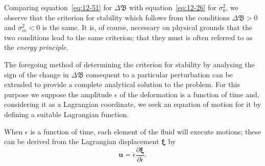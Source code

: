 Comparing equation~\eqref{eq:12-51} for $\Delta\mathfrak{B}$ with equation~\eqref{eq:12-26} for $\sigma_0^2$, we observe that the criterion for stability which follows from the conditions $\Delta\mathfrak{B} > 0$ and $\sigma_m^2 < 0$ is the same. It is, of course, necessary on physical grounds that the two conditions lead to the same criterion; that they must is often referred to as the \emph{energy principle}.

The foregoing method of determining the criterion for stability by analysing the sign of the change in $\Delta\mathfrak{B}$ consequent to a particular perturbation can be extended to provide a complete analytical solution to the problem. For this purpose we suppose the amplitude $\epsilon$ of the deformation is a function of time and, considering it as a Lagrangian coordinate, we seek an equation of motion for it by defining a suitable Lagrangian function.

When $\epsilon$ is a function of time, each element of the fluid will execute motions; these can be derived from the Lagrangian displacement $\boldsymbol\xi$ by
\begin{equation}
\label{eq:12-52}
\mathbf{u} = \dot{\epsilon} \frac{\partial \boldsymbol\xi}{\partial \epsilon}.
\end{equation}

